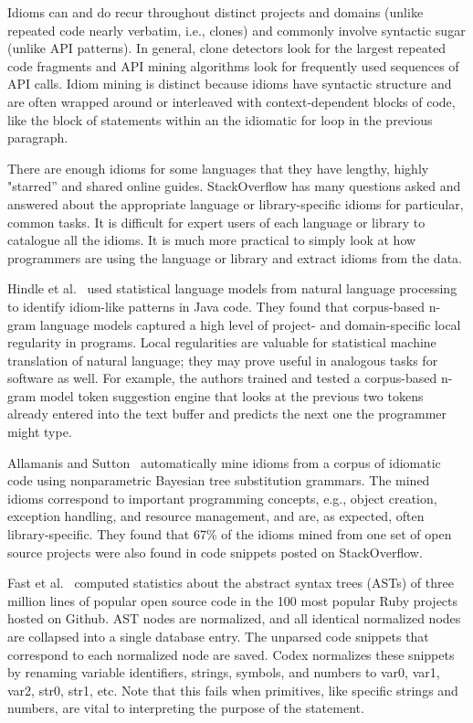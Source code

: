 Idioms can and do recur throughout distinct projects and domains (unlike repeated code nearly verbatim, i.e., clones) and commonly involve syntactic sugar (unlike API patterns). In general, clone detectors look for the largest repeated code fragments and API mining algorithms look for frequently used sequences of API calls. Idiom mining is distinct because idioms have syntactic structure and are often wrapped around or interleaved with context-dependent blocks of code, like the block of statements within an the idiomatic for loop in the previous paragraph.

There are enough idioms for some languages that they have lengthy, highly "starred'' and shared online guides. StackOverflow has many questions asked and answered about the appropriate language or library-specific idioms for particular, common tasks. It is difficult for expert users of each language or library to catalogue all the idioms. It is much more practical to simply look at how programmers are using the language or library and extract idioms from the data.

Hindle et al.~\cite{Hindle2012} used statistical language models from natural language processing to identify idiom-like patterns in Java code. They found that corpus-based n-gram language models captured a high level of project- and domain-specific local regularity in programs. Local regularities are valuable for statistical machine translation of natural language; they may prove useful in analogous tasks for software as well. For example, the authors trained and tested a corpus-based n-gram model token suggestion engine that looks at the previous two tokens already entered into the text buffer and predicts the next one the programmer might type.

Allamanis and Sutton~\cite{allamanis2014mining} automatically mine idioms from a corpus of idiomatic code using nonparametric Bayesian tree substitution grammars. The mined idioms correspond to important programming concepts, e.g., object creation, exception handling, and resource management, and are, as expected, often library-specific. They found that 67\% of the idioms mined from one set of open source projects were also found in code snippets posted on StackOverflow.

Fast et al.~\cite{codex} computed statistics about the abstract syntax trees (ASTs) of three million lines of popular open source code in the 100 most popular Ruby projects hosted on Github. AST nodes are normalized, and all identical normalized nodes are collapsed into a single database entry. The unparsed code snippets that correspond to each normalized node are saved. Codex normalizes these snippets by renaming variable identifiers, strings, symbols, and numbers to var0, var1, var2, str0, str1, etc. Note that this fails when primitives, like specific strings and numbers, are vital to interpreting the purpose of the statement.

